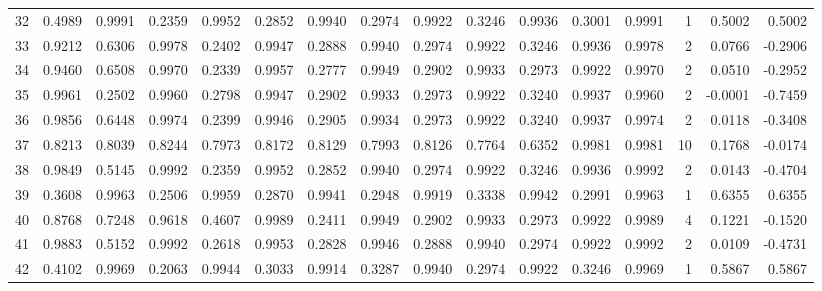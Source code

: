 \begin{tabular}{lrrrrrrrrrrrrrrr}
32  &      0.4989 &  0.9991 &  0.2359 &  0.9952 &  0.2852 &  0.9940 &  0.2974 &  0.9922 &  0.3246 &  0.9936 &   0.3001 &     0.9991 &      1 &                    0.5002 &                     0.5002 \\
33  &      0.9212 &  0.6306 &  0.9978 &  0.2402 &  0.9947 &  0.2888 &  0.9940 &  0.2974 &  0.9922 &  0.3246 &   0.9936 &     0.9978 &      2 &                    0.0766 &                    -0.2906 \\
34  &      0.9460 &  0.6508 &  0.9970 &  0.2339 &  0.9957 &  0.2777 &  0.9949 &  0.2902 &  0.9933 &  0.2973 &   0.9922 &     0.9970 &      2 &                    0.0510 &                    -0.2952 \\
35  &      0.9961 &  0.2502 &  0.9960 &  0.2798 &  0.9947 &  0.2902 &  0.9933 &  0.2973 &  0.9922 &  0.3240 &   0.9937 &     0.9960 &      2 &                   -0.0001 &                    -0.7459 \\
36  &      0.9856 &  0.6448 &  0.9974 &  0.2399 &  0.9946 &  0.2905 &  0.9934 &  0.2973 &  0.9922 &  0.3240 &   0.9937 &     0.9974 &      2 &                    0.0118 &                    -0.3408 \\
37  &      0.8213 &  0.8039 &  0.8244 &  0.7973 &  0.8172 &  0.8129 &  0.7993 &  0.8126 &  0.7764 &  0.6352 &   0.9981 &     0.9981 &     10 &                    0.1768 &                    -0.0174 \\
38  &      0.9849 &  0.5145 &  0.9992 &  0.2359 &  0.9952 &  0.2852 &  0.9940 &  0.2974 &  0.9922 &  0.3246 &   0.9936 &     0.9992 &      2 &                    0.0143 &                    -0.4704 \\
39  &      0.3608 &  0.9963 &  0.2506 &  0.9959 &  0.2870 &  0.9941 &  0.2948 &  0.9919 &  0.3338 &  0.9942 &   0.2991 &     0.9963 &      1 &                    0.6355 &                     0.6355 \\
40  &      0.8768 &  0.7248 &  0.9618 &  0.4607 &  0.9989 &  0.2411 &  0.9949 &  0.2902 &  0.9933 &  0.2973 &   0.9922 &     0.9989 &      4 &                    0.1221 &                    -0.1520 \\
41  &      0.9883 &  0.5152 &  0.9992 &  0.2618 &  0.9953 &  0.2828 &  0.9946 &  0.2888 &  0.9940 &  0.2974 &   0.9922 &     0.9992 &      2 &                    0.0109 &                    -0.4731 \\
42  &      0.4102 &  0.9969 &  0.2063 &  0.9944 &  0.3033 &  0.9914 &  0.3287 &  0.9940 &  0.2974 &  0.9922 &   0.3246 &     0.9969 &      1 &                    0.5867 &                     0.5867 \\

\end{tabular}

